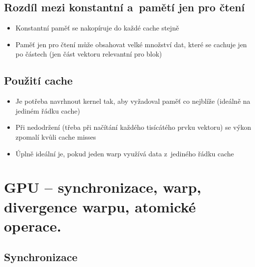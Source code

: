 \subsection{Rozdíl mezi konstantní a~pamětí jen pro čtení}
\begin{itemize}
    \item Konstantní paměť se nakopíruje do každé cache stejně
    \item Paměť jen pro čtení může obsahovat velké množství dat, které se cachuje jen po částech (jen část vektoru relevantní pro blok)
\end{itemize}

\subsection{Použití cache}
\begin{itemize}
    \item Je potřeba navrhnout kernel tak, aby vyžadoval paměť co nejblíže (ideálně na jediném řádku cache)
    \item Při nedodržení (třeba při načítání každého tisícátého prvku vektoru) se výkon zpomalí kvůli cache misses
    \item Úplně ideální je, pokud jeden warp využívá data z~jediného řádku cache
\end{itemize}

\section{GPU – synchronizace, warp, divergence warpu, atomické operace.}
\subsection{Synchronizace}
